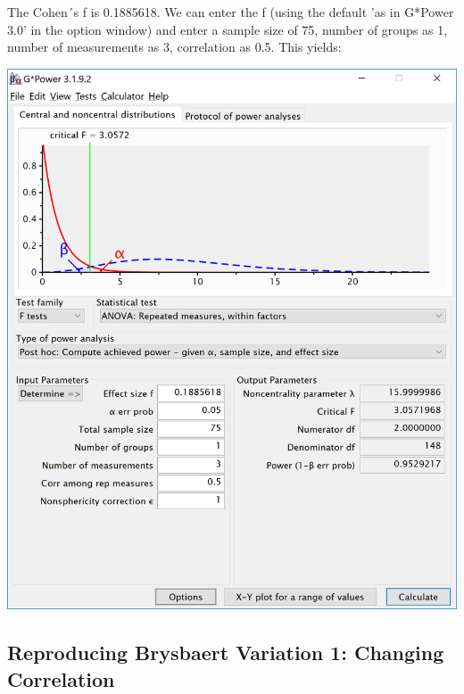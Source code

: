 \documentclass[]{book}
\begin{document}
The Cohen´s f is 0.1885618. We can enter the f (using the default 'as in G*Power 3.0' in the option window) and enter a sample size of 75, number of groups as 1, number of measurements as 3, correlation as 0.5. This yields:

\includegraphics{screenshots/gpower_3.png}

\hypertarget{reproducing-brysbaert-variation-1-changing-correlation}{%
\subsection{Reproducing Brysbaert Variation 1: Changing Correlation}\label{reproducing-brysbaert-variation-1-changing-correlation}}
\end{document}
